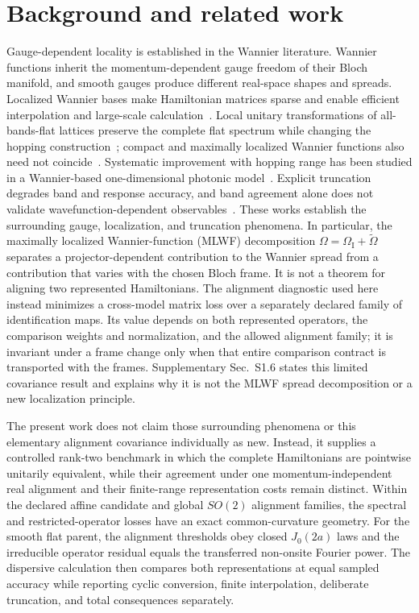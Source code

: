 \documentclass[aps,prb,reprint,amsmath,amssymb,longbibliography,floatfix]{revtex4-2}
\begin{document}
\section{Background and related work}

Gauge-dependent locality is established in the Wannier literature. Wannier functions
inherit the momentum-dependent gauge freedom of their Bloch manifold, and smooth gauges
produce different real-space shapes and spreads. Localized Wannier bases make
Hamiltonian matrices sparse and enable efficient interpolation and large-scale
calculation~\cite{marzari1997,souza2001,yates2007,marzari2012,marrazzo2024}. Local unitary transformations of
all-bands-flat lattices preserve the complete flat spectrum while changing the hopping
construction~\cite{danieli2021}; compact and maximally localized Wannier functions also
need not coincide~\cite{sathe2024}. Systematic improvement with hopping range has been
studied in a Wannier-based one-dimensional photonic model~\cite{gupta2022}. Explicit
truncation degrades band and response accuracy, and band agreement alone does not
validate wavefunction-dependent observables~\cite{ghosh2025}. These works establish the surrounding gauge, localization, and truncation phenomena.
In particular, the maximally localized Wannier-function (MLWF) decomposition
$\Omega=\Omega_{\mathrm I}+\widetilde\Omega$ separates a projector-dependent contribution
to the Wannier spread from a contribution that varies with the chosen Bloch frame. It is
not a theorem for aligning two represented Hamiltonians. The alignment diagnostic used
here instead minimizes a cross-model matrix loss over a separately declared family of
identification maps. Its value depends on both represented operators, the comparison
weights and normalization, and the allowed alignment family; it is invariant under a
frame change only when that entire comparison contract is transported with the frames.
Supplementary Sec.~S1.6 states this limited covariance result and explains why it is not
the MLWF spread decomposition or a new localization principle.

The present work does not claim those surrounding phenomena or this elementary
alignment covariance individually as new. Instead, it supplies a controlled rank-two
benchmark in which the complete Hamiltonians are
pointwise unitarily equivalent, while their agreement under one momentum-independent
real alignment and their finite-range representation costs remain distinct. Within the
declared affine candidate and global $SO(2)$ alignment families, the spectral and
restricted-operator losses have an exact common-curvature geometry. For the smooth flat
parent, the alignment thresholds obey closed $J_0(2a)$ laws and the irreducible operator
residual equals the transferred non-onsite Fourier power. The dispersive calculation
then compares both representations at equal sampled accuracy while reporting cyclic
conversion, finite interpolation, deliberate truncation, and total consequences
separately.
\end{document}
